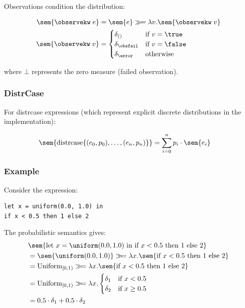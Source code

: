 Observations condition the distribution:

\begin{align*}
\sem{ \observekw\; e } &= \sem{ e } \gg\!= \lambda v. \sem{ \observekw\; v } \\
%
\sem{ \observekw\; v} &=
\begin{cases}
	\delta_{()}  & \text{if $v=\true$} \\
	\delta_{\obsfail} & \text{if $v=\false$} \\
	\delta_\error & \text{otherwise}
\end{cases}
\end{align*}

where $\bot$ represents the zero measure (failed observation).

\subsubsection{DistrCase}

For distrcase expressions (which represent explicit discrete distributions in the implementation):

\begin{align*}
\sem{ \text{distrcase}\{(e_0, p_0), \ldots, (e_n, p_n)\} } &= \sum_{i=0}^n p_i \cdot \sem{ e_i }
\end{align*}

\subsubsection{Example}

Consider the expression:
\begin{lstlisting}
let x = uniform(0.0, 1.0) in
if x < 0.5 then 1 else 2
\end{lstlisting}

The probabilistic semantics gives:
\begin{align*}
&\sem{ \text{let } x = \uniform(0.0, 1.0) \text{ in if } x < 0.5 \text{ then } 1 \text{ else } 2 } \\
&= \sem{ \uniform(0.0, 1.0) } \gg\!= \lambda x. \sem{ \text{if } x < 0.5 \text{ then } 1 \text{ else } 2 } \\
&= \text{Uniform}_{[0,1)} \gg\!= \lambda x. \sem{ \text{if } x < 0.5 \text{ then } 1 \text{ else } 2 } \\
&= \text{Uniform}_{[0,1)} \gg\!= \lambda x. \begin{cases}
    \delta_1 & \text{if } x < 0.5 \\
    \delta_2 & \text{if } x \geq 0.5
\end{cases} \\
&= 0.5 \cdot \delta_1 + 0.5 \cdot \delta_2
\end{align*}

